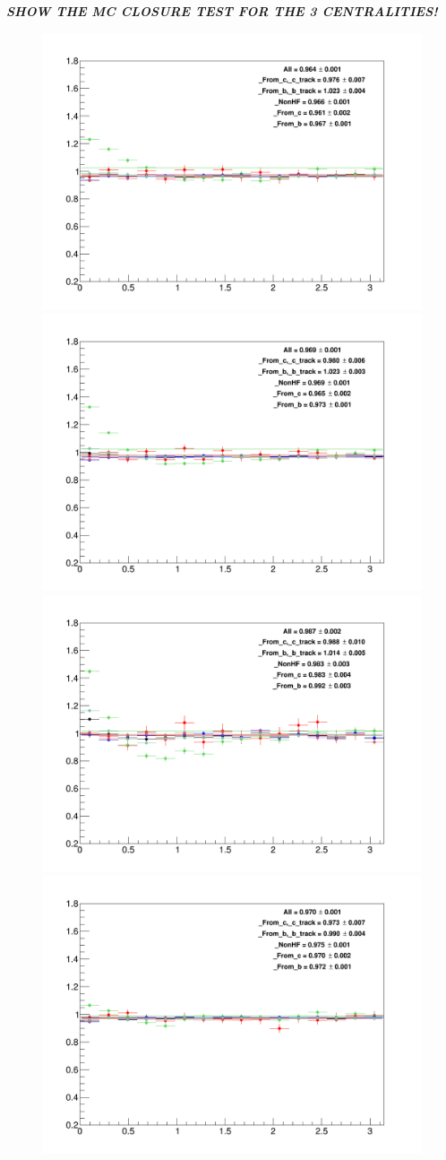 \textit{\textbf{SHOW THE MC CLOSURE TEST FOR THE 3 CENTRALITIES!}}


\begin{figure}
{\includegraphics[width=.48\linewidth]{figuresVsCent/Global/MCClosure/020/MCClosure_Dzero_Canvas_PtIntBins4to5_PoolInt_thr03to1.png}
{\includegraphics[width=.48\linewidth]{figuresVsCent/Global/MCClosure/020/MCClosure_Dzero_Canvas_PtIntBins4to5_PoolInt_thr03to99.png}
{\includegraphics[width=.48\linewidth]{figuresVsCent/Global/MCClosure/020/MCClosure_Dzero_Canvas_PtIntBins4to5_PoolInt_thr1to99.png}
{\includegraphics[width=.48\linewidth]{figuresVsCent/Global/MCClosure/020/MCClosure_Dzero_Canvas_PtIntBins6to8_PoolInt_thr03to1.png}
}}}}
\end{figure}

